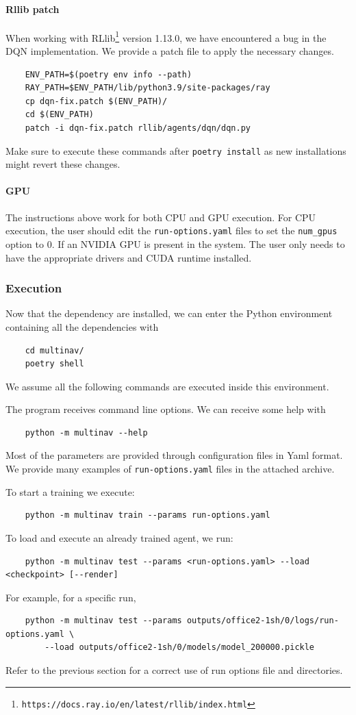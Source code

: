\paragraph{Rllib patch}
When working with RLlib\footnote{\texttt{https://docs.ray.io/en/latest/rllib/index.html}} version 1.13.0,
we have encountered a bug in the DQN implementation. 
We provide a patch file to apply the necessary changes.
\begin{verbatim}
	ENV_PATH=$(poetry env info --path)
	RAY_PATH=$ENV_PATH/lib/python3.9/site-packages/ray
	cp dqn-fix.patch $(ENV_PATH)/
	cd $(ENV_PATH)
	patch -i dqn-fix.patch rllib/agents/dqn/dqn.py
\end{verbatim}
Make sure to execute these commands after \texttt{poetry install} as new installations
might revert these changes.


\paragraph{GPU}
The instructions above work for both CPU and GPU execution.
For CPU execution, the user should edit the \texttt{run-options.yaml} files
to set the \texttt{num\_gpus} option to 0.
If an NVIDIA GPU is present in the system. The user only needs to have the
appropriate drivers and CUDA runtime installed.


\subsubsection*{Execution}

Now that the dependency are installed, we can enter the Python environment containing
all the dependencies with
\begin{verbatim}
	cd multinav/
	poetry shell
\end{verbatim}
We assume all the following commands are executed inside this environment.

The program receives command line options. We can receive some help with
\begin{verbatim}
	python -m multinav --help
\end{verbatim}
Most of the parameters are provided through configuration files in Yaml format.
We provide many examples of \texttt{run-options.yaml} files in the attached archive.

To start a training we execute:
\begin{verbatim}
	python -m multinav train --params run-options.yaml
\end{verbatim}
To load and execute an already trained agent, we run:
\begin{verbatim}
	python -m multinav test --params <run-options.yaml> --load <checkpoint> [--render]
\end{verbatim}
For example, for a specific run,
\begin{verbatim}
	python -m multinav test --params outputs/office2-1sh/0/logs/run-options.yaml \
		--load outputs/office2-1sh/0/models/model_200000.pickle
\end{verbatim}
Refer to the previous section for a correct use of run options file and directories.

